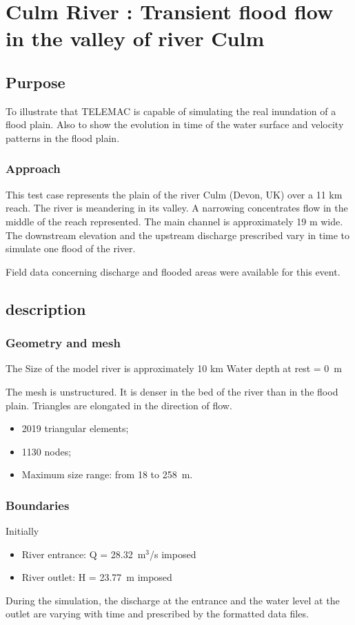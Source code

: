\chapter{Culm River : Transient flood flow in the valley of river Culm}
\section{Purpose}
To illustrate that TELEMAC   is capable of simulating the real
inundation of a flood plain. Also to show the evolution in time of the 
water surface and velocity patterns in the flood plain.

\subsection{Approach}
This test case represents the plain of the river Culm (Devon, UK) over a 11 km
reach. The river is meandering in its valley. A narrowing concentrates
flow in the middle of the reach represented. The main channel is
approximately 19 m wide. The downstream elevation and the upstream discharge
prescribed vary in time to simulate one flood of the river.

Field data concerning discharge and flooded areas were available for this event.

\section{description}

\subsection{Geometry and mesh}

The  Size of the model river is approximately 10 km
Water depth at rest = 0~m

The mesh is unstructured. It is denser in the bed of the river than in the flood plain.
Triangles are elongated in the direction of flow.
\begin{itemize}
\item 2019 triangular elements;
\item 1130 nodes;
\item Maximum size range: from 18 to 258~m.
\end{itemize}

\subsection{Boundaries}
Initially
\begin{itemize}
\item River entrance: Q = 28.32~m$^3$/s imposed
\item  River outlet: H = 23.77~m imposed
 \end{itemize}
During the simulation, the discharge at the entrance and the water level at the outlet are
varying with time and prescribed by the formatted data files.

